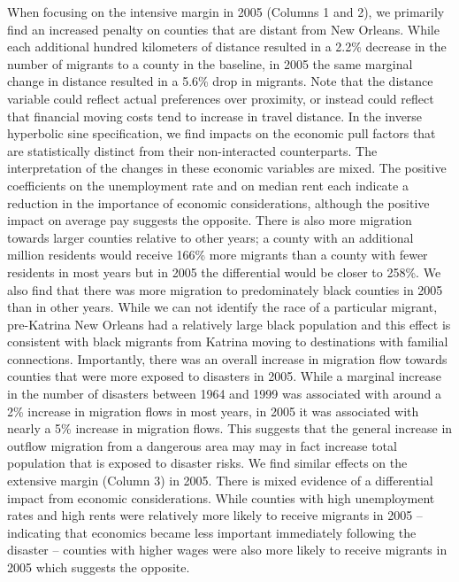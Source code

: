 \documentclass[]{article}
\begin{document}
When focusing on the intensive margin in 2005 (Columns 1 and 2), we
primarily find an increased penalty on counties that are distant from
New Orleans. While each additional hundred kilometers of distance
resulted in a 2.2\% decrease in the number of migrants to a county in
the baseline, in 2005 the same marginal change in distance resulted in a
5.6\% drop in migrants. Note that the distance variable could reflect
actual preferences over proximity, or instead could reflect that
financial moving costs tend to increase in travel distance. In the
inverse hyperbolic sine specification, we find impacts on the economic
pull factors that are statistically distinct from their non-interacted
counterparts. The interpretation of the changes in these economic
variables are mixed. The positive coefficients on the unemployment rate
and on median rent each indicate a reduction in the importance of
economic considerations, although the positive impact on average pay
suggests the opposite. There is also more migration towards larger
counties relative to other years; a county with an additional million
residents would receive 166\% more migrants than a county with fewer
residents in most years but in 2005 the differential would be closer to
258\%. We also find that there was more migration to predominately black
counties in 2005 than in other years. While we can not identify the race
of a particular migrant, pre-Katrina New Orleans had a relatively large
black population and this effect is consistent with black migrants from
Katrina moving to destinations with familial connections. Importantly,
there was an overall increase in migration flow towards counties that
were more exposed to disasters in 2005. While a marginal increase in the
number of disasters between 1964 and 1999 was associated with around a
2\% increase in migration flows in most years, in 2005 it was associated
with nearly a 5\% increase in migration flows. This suggests that the
general increase in outflow migration from a dangerous area may may in
fact increase total population that is exposed to disaster risks. We
find similar effects on the extensive margin (Column 3) in 2005. There
is mixed evidence of a differential impact from economic considerations.
While counties with high unemployment rates and high rents were
relatively more likely to receive migrants in 2005 -- indicating that
economics became less important immediately following the disaster --
counties with higher wages were also more likely to receive migrants in
2005 which suggests the opposite.
\end{document}
